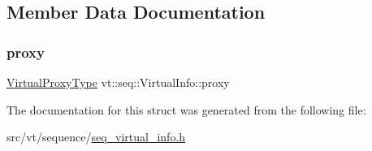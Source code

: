 \subsection{Member Data Documentation}
\mbox{\label{structvt_1_1seq_1_1_virtual_info_a7370df453a7e65bf2f177dd988d8d089}} 
\subsubsection{\texorpdfstring{proxy}{proxy}}
{\footnotesize\ttfamily \hyperlink{namespacevt_a1b417dd5d684f045bb58a0ede70045ac}{Virtual\+Proxy\+Type} vt\+::seq\+::\+Virtual\+Info\+::proxy}



The documentation for this struct was generated from the following file\+:\begin{DoxyCompactItemize}
\item 
src/vt/sequence/\hyperlink{seq__virtual__info_8h}{seq\+\_\+virtual\+\_\+info.\+h}\end{DoxyCompactItemize}
